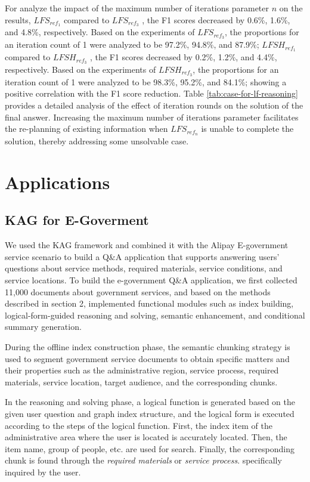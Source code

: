 \documentclass{article}
\begin{document}
For analyze the impact of the maximum number of iterations parameter $n$ on the results, $LFS_{ref_{1}}$ compared to $LFS_{ref_{3}}$ , the F1 scores decreased by 0.6\%, 1.6\%, and 4.8\%, respectively. Based on the experiments of $LFS_{ref_{3}}$, the proportions for an iteration count of 1 were analyzed to be 97.2\%, 94.8\%, and 87.9\%; $LFSH_{ref_{1}}$ compared to $LFSH_{ref_{3}}$ , the F1 scores decreased by 0.2\%, 1.2\%, and 4.4\%, respectively. Based on the experiments of $LFSH_{ref_{3}}$, the proportions for an iteration count of 1 were analyzed to be 98.3\%, 95.2\%, and 84.1\%; showing a positive correlation with the F1 score reduction. Table \ref{tab:case-for-lf-reasoning} provides a detailed analysis of the effect of iteration rounds on the solution of the final answer. Increasing the maximum number of iterations parameter facilitates the re-planning of existing information when $LFS_{ref_{n}}$ is unable to complete the solution, thereby addressing some unsolvable case.

\section{Applications}
\subsection{KAG for E-Goverment}

We used the KAG framework and combined it with the Alipay E-government service scenario to build a Q\&A application that supports answering users' questions about service methods, required materials, service conditions, and service locations. To build the e-government Q\&A application, we first collected 11,000 documents about government services, and based on the methods described in section 2, implemented functional modules such as index building, logical-form-guided reasoning and solving, semantic enhancement, and conditional summary generation.

During the offline index construction phase, the semantic chunking strategy is used to segment government service documents to obtain specific matters and their properties such as the administrative region, service process, required materials, service location, target audience, and the corresponding chunks.

In the reasoning and solving phase, a logical function is generated based on the given user question and graph index structure, and the logical form is executed according to the steps of the logical function. First, the index item of the administrative area where the user is located is accurately located. Then, the item name, group of people, etc. are used for search. Finally, the corresponding chunk is found through the \textit{required materials} or \textit{service process}. specifically inquired by the user.
\end{document}
